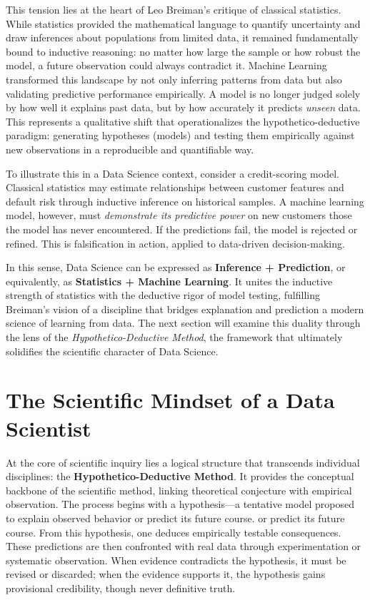 \documentclass[
  12pt,
  letterpaper,
]{book}
\begin{document}
This tension lies at the heart of Leo Breiman's critique of classical
statistics. While statistics provided the mathematical language to
quantify uncertainty and draw inferences about populations from limited
data, it remained fundamentally bound to inductive reasoning: no matter
how large the sample or how robust the model, a future observation could
always contradict it. Machine Learning transformed this landscape by not
only inferring patterns from data but also validating predictive
performance empirically. A model is no longer judged solely by how well
it explains past data, but by how accurately it predicts \emph{unseen}
data. This represents a qualitative shift that operationalizes the
hypothetico-deductive paradigm: generating hypotheses (models) and
testing them empirically against new observations in a reproducible and
quantifiable way.

To illustrate this in a Data Science context, consider a credit-scoring
model. Classical statistics may estimate relationships between customer
features and default risk through inductive inference on historical
samples. A machine learning model, however, must \emph{demonstrate its
predictive power} on new customers those the model has never
encountered. If the predictions fail, the model is rejected or refined.
This is falsification in action, applied to data-driven decision-making.

In this sense, Data Science can be expressed as \textbf{Inference +
Prediction}, or equivalently, as \textbf{Statistics + Machine Learning}.
It unites the inductive strength of statistics with the deductive rigor
of model testing, fulfilling Breiman's vision of a discipline that
bridges explanation and prediction a modern science of learning from
data. The next section will examine this duality through the lens of the
\emph{Hypothetico-Deductive Method}, the framework that ultimately
solidifies the scientific character of Data Science.

\section{The Scientific Mindset of a Data
Scientist}\label{the-scientific-mindset-of-a-data-scientist}

At the core of scientific inquiry lies a logical structure that
transcends individual disciplines: the \textbf{Hypothetico-Deductive
Method}. It provides the conceptual backbone of the scientific method,
linking theoretical conjecture with empirical observation. The process
begins with a hypothesis---a tentative model proposed to explain
observed behavior or predict its future course. or predict its future
course. From this hypothesis, one deduces empirically testable
consequences. These predictions are then confronted with real data
through experimentation or systematic observation. When evidence
contradicts the hypothesis, it must be revised or discarded; when the
evidence supports it, the hypothesis gains provisional credibility,
though never definitive truth.
\end{document}
